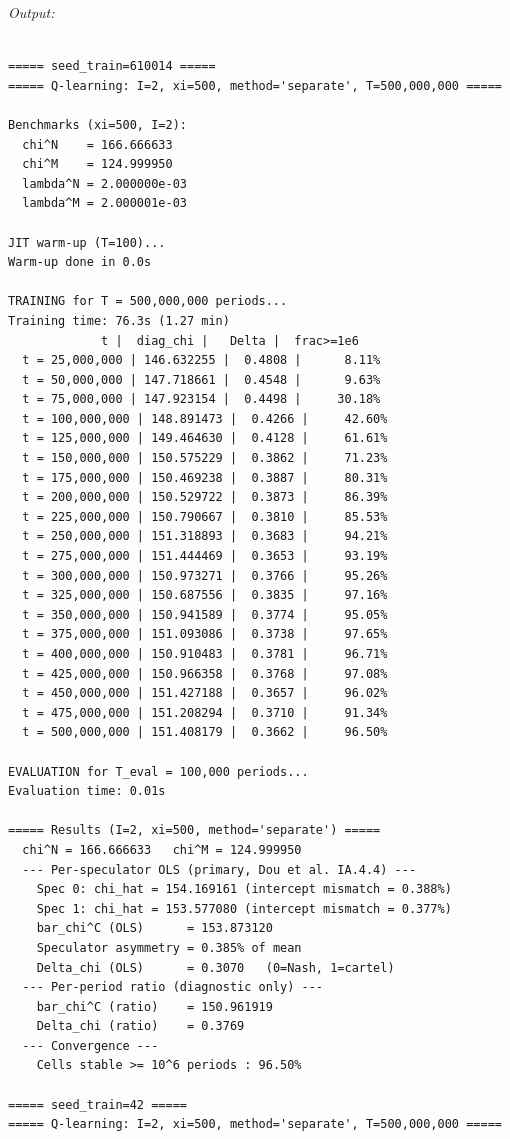 \noindent\textit{Output:}
\begin{lstlisting}[style=outputstyle]

===== seed_train=610014 =====
===== Q-learning: I=2, xi=500, method='separate', T=500,000,000 =====

Benchmarks (xi=500, I=2):
  chi^N    = 166.666633
  chi^M    = 124.999950
  lambda^N = 2.000000e-03
  lambda^M = 2.000001e-03

JIT warm-up (T=100)...
Warm-up done in 0.0s

TRAINING for T = 500,000,000 periods...
Training time: 76.3s (1.27 min)
             t |  diag_chi |   Delta |  frac>=1e6
  t = 25,000,000 | 146.632255 |  0.4808 |      8.11%
  t = 50,000,000 | 147.718661 |  0.4548 |      9.63%
  t = 75,000,000 | 147.923154 |  0.4498 |     30.18%
  t = 100,000,000 | 148.891473 |  0.4266 |     42.60%
  t = 125,000,000 | 149.464630 |  0.4128 |     61.61%
  t = 150,000,000 | 150.575229 |  0.3862 |     71.23%
  t = 175,000,000 | 150.469238 |  0.3887 |     80.31%
  t = 200,000,000 | 150.529722 |  0.3873 |     86.39%
  t = 225,000,000 | 150.790667 |  0.3810 |     85.53%
  t = 250,000,000 | 151.318893 |  0.3683 |     94.21%
  t = 275,000,000 | 151.444469 |  0.3653 |     93.19%
  t = 300,000,000 | 150.973271 |  0.3766 |     95.26%
  t = 325,000,000 | 150.687556 |  0.3835 |     97.16%
  t = 350,000,000 | 150.941589 |  0.3774 |     95.05%
  t = 375,000,000 | 151.093086 |  0.3738 |     97.65%
  t = 400,000,000 | 150.910483 |  0.3781 |     96.71%
  t = 425,000,000 | 150.966358 |  0.3768 |     97.08%
  t = 450,000,000 | 151.427188 |  0.3657 |     96.02%
  t = 475,000,000 | 151.208294 |  0.3710 |     91.34%
  t = 500,000,000 | 151.408179 |  0.3662 |     96.50%

EVALUATION for T_eval = 100,000 periods...
Evaluation time: 0.01s

===== Results (I=2, xi=500, method='separate') =====
  chi^N = 166.666633   chi^M = 124.999950
  --- Per-speculator OLS (primary, Dou et al. IA.4.4) ---
    Spec 0: chi_hat = 154.169161 (intercept mismatch = 0.388%)
    Spec 1: chi_hat = 153.577080 (intercept mismatch = 0.377%)
    bar_chi^C (OLS)      = 153.873120
    Speculator asymmetry = 0.385% of mean
    Delta_chi (OLS)      = 0.3070   (0=Nash, 1=cartel)
  --- Per-period ratio (diagnostic only) ---
    bar_chi^C (ratio)    = 150.961919
    Delta_chi (ratio)    = 0.3769
  --- Convergence ---
    Cells stable >= 10^6 periods : 96.50%

===== seed_train=42 =====
===== Q-learning: I=2, xi=500, method='separate', T=500,000,000 =====


\end{lstlisting}
